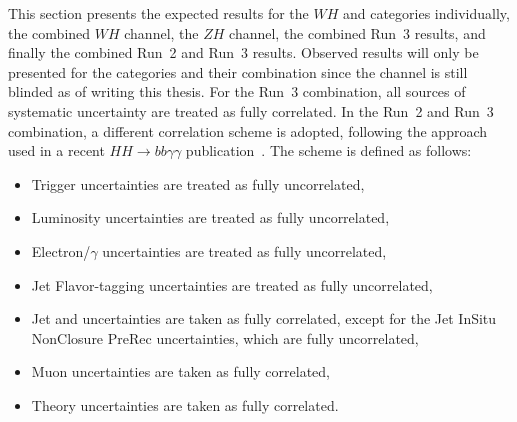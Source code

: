 This section presents the expected results for the $WH$ \zdom{} and \zdep{} categories individually, the combined $WH$ channel, the $ZH$ channel, the combined Run~3 results, and finally the combined Run~2 and Run~3 results. Observed results will only be presented for the \wh{} categories and their combination since the \zh{} channel is still blinded as of writing this thesis. For the Run~3 combination, all sources of systematic uncertainty are treated as fully correlated. In the Run~2 and Run~3 combination, a different correlation scheme is adopted, following the approach used in a recent $HH \to bb\gamma\gamma$ publication~\cite{ATLAS:2025hhd}. The scheme is defined as follows:
\begin{itemize}
  \item Trigger uncertainties are treated as fully uncorrelated,
  \item Luminosity uncertainties are treated as fully uncorrelated,
  \item Electron/$\gamma$ uncertainties are treated as fully uncorrelated,
  \item Jet Flavor-tagging uncertainties are treated as fully uncorrelated,
  \item Jet and \met{} uncertainties are taken as fully correlated, except for the Jet InSitu NonClosure PreRec uncertainties, which are fully uncorrelated,
  \item Muon uncertainties are taken as fully correlated,
  \item Theory uncertainties are taken as fully correlated.
\end{itemize}